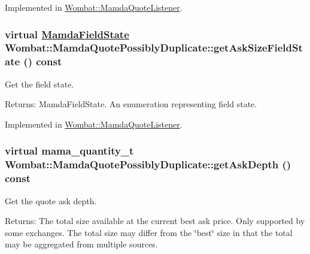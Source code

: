 Implemented in \hyperlink{classWombat_1_1MamdaQuoteListener_4808439461507148c55e678a3dffbb5d}{Wombat::Mamda\-Quote\-Listener}.\hypertarget{classWombat_1_1MamdaQuotePossiblyDuplicate_4cf3ddbe58a546d9a377c650779ad819}{
\subsubsection[getAskSizeFieldState]{\setlength{\rightskip}{0pt plus 5cm}virtual \hyperlink{namespaceWombat_93aac974f2ab713554fd12a1fa3b7d2a}{Mamda\-Field\-State} Wombat::Mamda\-Quote\-Possibly\-Duplicate::get\-Ask\-Size\-Field\-State () const}}
\label{classWombat_1_1MamdaQuotePossiblyDuplicate_4cf3ddbe58a546d9a377c650779ad819}


Get the field state. 

\begin{Desc}
\item[Returns:]Mamda\-Field\-State. An enumeration representing field state. \end{Desc}


Implemented in \hyperlink{classWombat_1_1MamdaQuoteListener_4e3d063324f15dacfaf2eec0f7f31e71}{Wombat::Mamda\-Quote\-Listener}.\hypertarget{classWombat_1_1MamdaQuotePossiblyDuplicate_3eff03cd27a33edc6e2b306aa0c3fa44}{
\subsubsection[getAskDepth]{\setlength{\rightskip}{0pt plus 5cm}virtual mama\_\-quantity\_\-t Wombat::Mamda\-Quote\-Possibly\-Duplicate::get\-Ask\-Depth () const}}
\label{classWombat_1_1MamdaQuotePossiblyDuplicate_3eff03cd27a33edc6e2b306aa0c3fa44}


Get the quote ask depth. 

\begin{Desc}
\item[Returns:]The total size available at the current best ask price. Only supported by some exchanges. The total size may differ from the \char`\"{}best\char`\"{} size in that the total may be aggregated from multiple sources. \end{Desc}


